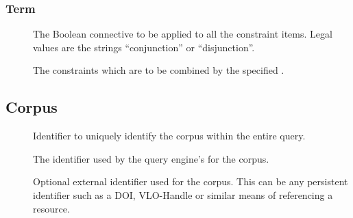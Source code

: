 \documentclass[11pt,a4paper]{article}
\begin{document}
\subsubsection{Term}
\label{sec:json-ld-term}
\begin{attributes}{}
\end{attributes}
\begin{description}
	\item[] The Boolean connective to be applied to all the constraint items. Legal values are the strings ``conjunction'' or ``disjunction''.
\end{description}
\begin{elements}{}
\end{elements}
\begin{description}
	\item[] The constraints which are to be combined by the specified .
\end{description}

\subsection{Corpus}
\label{sec:json-ld-corpus}
\begin{attributes}{}
\end{attributes}
\begin{description}
	\item[] Identifier to uniquely identify the corpus within the entire query.
	\item[] The identifier used by the query engine's  for the corpus.
	\item[] Optional external identifier used for the corpus. This can be any persistent identifier such as a DOI, VLO-Handle or similar means of referencing a resource.
\end{description}
\end{document}
